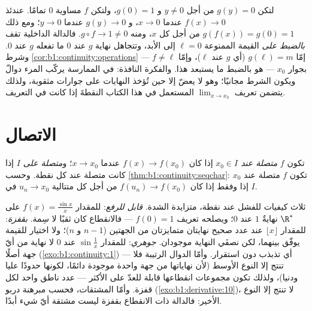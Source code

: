 \begin{example}\label{ex:b1:continuity:compositiontrap}
لتكن $g(y) = 0$ من أجل $y \neq 0$ و $g(0) = 1$، ولتكن $f$
مساوية $0$ تمامًا. عندئذ $f(x) \to 0$ عندما $x \to 0$، و $g(y) \to 0$
عندما $y \to 0$؛ ومع ذلك $g(f(x)) = g(0) = 1$ من أجل كل $x$، ومنه $g
\circ f \to 1 \neq 0$. فالدالة الداخلية تقف \emph{بالضبط على}
القيمة الممنوعة $\ell = 0$ إلى الأبد، وتتجاهل نهاية $g$ عند $0$
ما تفعله $g$ عند $0$. وشرط
\cref{cor:b1:continuity:operations} --- إمّا $g(\ell) = m$
(أي $g$  عند $\ell$)، وإمّا $f \neq \ell$ بجوار $x_0$ ---
هو بالضبط ما يستبعد هذا. والفكرة النافذة: في
الممارسة يركّب المرء دوالّ \emph{} ويكون
الشرط مجانيًا؛ وهو لا يعضّ إلا حين تُؤخذ النهايات على
جوارات مثقوبة، ولذلك يتضمن تعريف
$\lim_{x \to x_0}$ المستعمل في هذا الكتاب النقطةَ إذا كانت
في  التعريف.
\end{example}

\section{الاتصال}

\begin{definition}\label{def:b1:continuity:continuous}
تكون $f$ \emph{متصلة عند $x_0 \in I$} إذا كان $f(x)
\to f(x_0)$ عندما $x \to x_0$؛ و\emph{متصلة على $I$} إذا كانت
متصلة عند كل نقطة. وحسب
\cref{thm:b1:continuity:seqchar}: تكون $f$ متصلة عند $x_0$ إذا وفقط إذا كان
$f(u_n) \to f(x_0)$ من أجل كل متتالية $u_n \to x_0$ في $I$.
\end{definition}

\begin{example}\label{ex:b1:continuity:taxonomy}
ثلاث كيفيات للفشل عند نقطة، متزايدة الشدة.
\emph{قابل للرفع}: للمقدار $f(x) = \frac{\sin x}{x}$ على $\R^*$ نهايةٌ
$1$ عند $0$؛ ويصلحه تعريف $f(0) = 1$ --- فالانقطاع
كان ثقبًا لا سِمة. \emph{بقفزة}: للمقدار $\lfloor x \rfloor$ عند
عدد صحيح نهايتان متمايزتان من الجهتين ($n - 1$ و $n$)؛ ولا
اختيار للقيمة يوفّق بينهما، لكن نصفَي النهاية موجودان.
\emph{جوهري}: للمقدار $\sin\frac1x$ عند $0$ لا نهاية من أيّ جهة
أصلًا (\cref{exo:b1:continuity:1}) --- أي تذبذب دون
استقرار. وأمّا الدوال الرتيبة فلا تنتج إلا النوع الأوسط
(لأن نهاياتها من جهة واحدة موجودة دائمًا، لكونها حدودًا عليا ودنيا)،
ولذلك تكون مجموعات انقطاعها قابلة للعدّ على الأكثر ---
عدد ناطق واحد لكل قفزة. وأمّا المشتقات، فحسب مبرهنة دربو
(\cref{exo:b1:derivative:10})، لا تنتج إلا النوع الأخير:
فالدالة ذات الانقطاع بقفزة ليست مشتقة أيّ شيء أبدًا.
\end{example}

